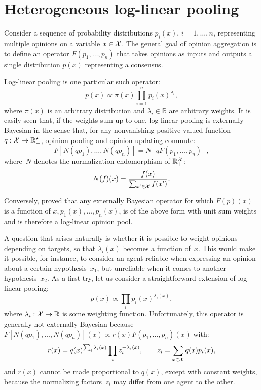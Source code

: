 \documentclass[english]{scrartcl}
\begin{document}
\section{Heterogeneous log-linear pooling}
\label{app:hetero}

Consider a sequence of probability distributions $p_i(x)$, $i=1,\ldots,n$, representing multiple opinions on a variable $x\in{\cal X}$. The general goal of opinion aggregation is to define an operator $F(p_1,\ldots,p_n)$ that takes opinions as inputs and outputs a single distribution $p(x)$ representing a consensus.

Log-linear pooling \cite{Genest-86} is one particular such operator:
$$
p(x)\propto \pi(x) \prod_{i=1}^n p_i(x)^{\lambda_i},
$$
where $\pi(x)$ is an arbitrary distribution and $\lambda_i\in\mathbb{R}$ are arbitrary weights. It is easily seen that, if the weights sum up to one, log-linear pooling is externally Bayesian in the sense that, for any nonvanishing positive valued function $q:{\cal X}\to \mathbb{R}^\star_+$, opinion pooling and opinion updating commute:
$$
F[N(q p_1), \ldots, N(q p_n)]
=
N[q F(p_1,\ldots, p_n)],
$$
where~$N$ denotes the normalization endomorphism of $\mathbb{R}_+^{\cal X}$:
$$
N(f)(x) = \frac{f(x)}{\sum_{x'\in{\cal X}} f(x')}
.
$$

Conversely, \cite{Genest-86b} proved that any externally Bayesian operator for which $F(p)(x)$ is a function of $x,p_1(x),\ldots,p_n(x)$, is of the above form with unit sum weights and is therefore a log-linear opinion pool. 

A question that arises naturally is whether it is possible to weight opinions depending on targets, so that $\lambda_i(x)$ becomes a function of~$x$. This would make it possible, for instance, to consider an agent reliable when expressing an opinion about a certain hypothesis~$x_1$, but unreliable when it comes to another hypothesis~$x_2$. As a first try, let us consider a straightforward extension of log-linear pooling: 
$$
p(x)\propto \prod_i p_i(x)^{\lambda_i(x)},
$$
where $\lambda_i : {\cal X}\to\mathbb{R}$ is some weighting function. Unfortunately, this operator is generally not externally Bayesian because $F[N(q p_1), \ldots, N(q p_n)](x)
\propto r(x) F(p_1,\ldots, p_n)(x)$ with:
$$
r(x) = q(x)^{\sum_i \lambda_i(x)} \prod_i z_i^{-\lambda_i(x)},
\qquad 
z_i = \sum_{x\in{\cal X}} q(x) p_i(x),
$$
and $r(x)$ cannot be made proportional to $q(x)$, except with constant weights, because the normalizing factors~$z_i$ may differ from one agent to the other.
\end{document}
